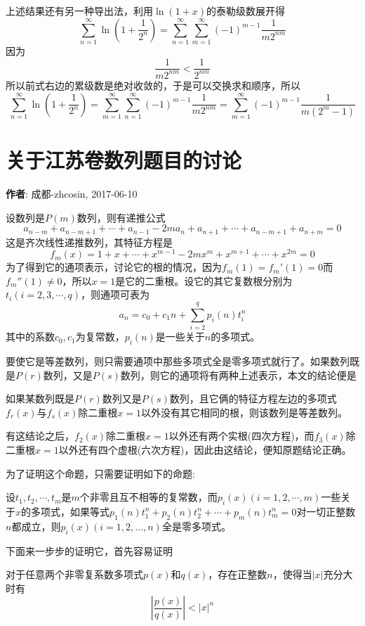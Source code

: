 \documentclass{ctexart}
\begin{document}
上述结果还有另一种导出法，利用$\ln{(1+x)}$的泰勒级数展开得
\[ \sum_{n=1}^{\infty} \ln{\left( 1+\frac{1}{2^n} \right)} = \sum_{n=1}^{\infty} \sum_{m=1}^{\infty} (-1)^{m-1} \frac{1}{m2^{nm}} \]
因为
\[ \frac{1}{m2^{nm}} < \frac{1}{2^{nm}} \]
所以前式右边的累级数是绝对收敛的，于是可以交换求和顺序，所以
\[ \sum_{n=1}^{\infty} \ln{\left( 1+\frac{1}{2^n} \right)} =  \sum_{m=1}^{\infty} \sum_{n=1}^{\infty}(-1)^{m-1} \frac{1}{m2^{nm}} = \sum_{m=1}^{\infty} (-1)^{m-1}\frac{1}{m(2^m-1)} \]

\section{关于江苏卷数列题目的讨论}
\label{sec:jiangshu-series-extend}

\textbf{作者}: 成都-zhcosin, 2017-06-10

  设数列是$P(m)$数列，则有递推公式
  \[ a_{n-m}+a_{n-m+1}+\cdots+a_{n-1}-2ma_n+a_{n+1}+\cdots+a_{n-m+1}+a_{n+m}=0 \]
  这是齐次线性递推数列，其特征方程是
  \[ f_m(x) = 1+x+\cdots+x^{m-1}-2mx^m+x^{m+1}+\cdots+x^{2m}=0 \]
  为了得到它的通项表示，讨论它的根的情况，因为$f_m(1)=f_m'(1)=0$而$f_m''(1) \neq 0$，所以$x=1$是它的二重根。设它的其它复数根分别为$t_i(i=2,3,\cdots,q)$，则通项可表为
  \[ a_n=c_0+c_1 n + \sum_{i=2}^q p_i(n)t_i^n \]
  其中的系数$c_0,c_1$为复常数，$p_i(n)$是一些关于$n$的多项式。

  要使它是等差数列，则只需要通项中那些多项式全是零多项式就行了。如果数列既是$P(r)$数列，又是$P(s)$数列，则它的通项将有两种上述表示，本文的结论便是
  \begin{statement}
    如果某数列既是$P(r)$数列又是$P(s)$数列，且它俩的特征方程左边的多项式$f_r(x)$与$f_s(x)$除二重根$x=1$以外没有其它相同的根，则该数列是等差数列。
  \end{statement}
  有这结论之后，$f_2(x)$除二重根$x=1$以外还有两个实根(四次方程)，而$f_3(x)$除二重根$x=1$以外还有四个虚根(六次方程)，因此由这结论，便知原题结论正确。

  为了证明这个命题，只需要证明如下的命题:
\begin{statement}
  \label{statement:p-t-0}
    设$t_1,t_2,\cdots,t_m$是$m$个非零且互不相等的复常数，而$p_i(x)(i=1,2,\cdots,m)$一些关于$x$的多项式，如果等式$p_1(n)t_1^n+p_2(n)t_2^n+\cdots+p_m(n)t_m^n=0$对一切正整数$n$都成立，则$p_i(x)(i=1,2,\ldots,n)$全是零多项式。
\end{statement}

下面来一步步的证明它，首先容易证明
\begin{lemma}
  \label{lemma:ration-equation-bounded}
  对于任意两个非零复系数多项式$p(x)$和$q(x)$，存在正整数$n$，使得当$|x|$充分大时有
  \[ \left| \frac{p(x)}{q(x)} \right| < |x|^n \]
\end{lemma}
\end{document}
